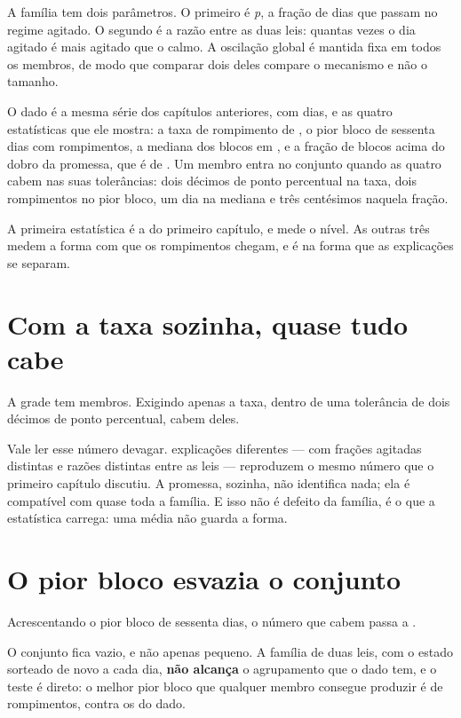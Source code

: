 A família tem dois parâmetros. O primeiro é \emph{p}, a fração de dias que passam no regime
agitado. O segundo é a razão entre as duas leis: quantas vezes o dia agitado é mais
agitado que o calmo. A oscilação global é mantida fixa em todos os membros, de modo que comparar
dois deles compare o mecanismo e não o tamanho.

O dado é a mesma série dos capítulos anteriores, com \numCondicionamentoDias{} dias, e as quatro
estatísticas que ele mostra: a taxa de rompimento de \numCondicionamentoTaxa, o pior bloco de
sessenta dias com \numCondicionamentoPior{} rompimentos, a mediana dos blocos em
\numCondicionamentoMediana, e a fração de blocos acima do dobro da promessa, que é de
\numCondicionamentoAcimaDoDobro. Um membro entra no conjunto quando as quatro cabem nas suas
tolerâncias: dois décimos de ponto percentual na taxa, dois rompimentos no pior bloco, um dia na
mediana e três centésimos naquela fração.

A primeira estatística é a do primeiro capítulo, e mede o nível. As outras três medem a forma com
que os rompimentos chegam, e é na forma que as explicações se separam.

\section{Com a taxa sozinha, quase tudo cabe}

A grade tem \numCondicionamentoCombinacoes{} membros. Exigindo apenas a taxa, dentro de uma
tolerância de dois décimos de ponto percentual, cabem \numCondicionamentoCabemTaxa{} deles.

Vale ler esse número devagar. \numCondicionamentoCabemTaxa{} explicações diferentes --- com frações agitadas
distintas e razões distintas entre as leis --- reproduzem o mesmo número que o primeiro capítulo discutiu. A promessa, sozinha, não identifica nada; ela é compatível com quase
toda a família. E isso não é defeito da família, é o que a estatística carrega: uma média não
guarda a forma.

\section{O pior bloco esvazia o conjunto}

Acrescentando o pior bloco de sessenta dias, o número que cabem passa a
\numCondicionamentoCabemTaxaPior{}.

O conjunto fica vazio, e não apenas pequeno. A família de duas leis, com
o estado sorteado de novo a cada dia, \textbf{não alcança} o agrupamento que o dado tem, e o teste é
direto: o melhor pior bloco que qualquer membro consegue produzir é de
\numCondicionamentoMelhorPior{} rompimentos, contra os \numCondicionamentoPior{} do dado.

